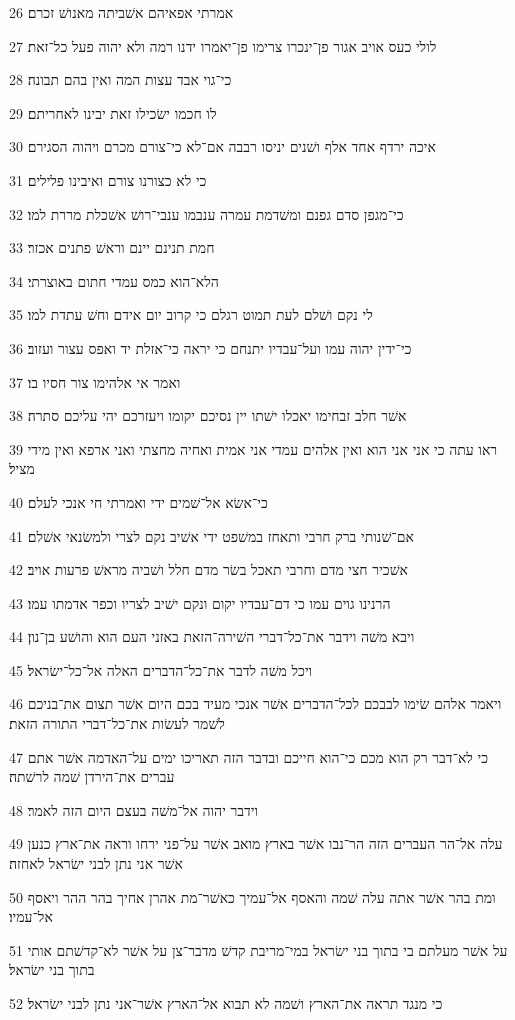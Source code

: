\par 26 אמרתי אפאיהם אשׁביתה מאנושׁ זכרם׃
\par 27 לולי כעס אויב אגור פן־ינכרו צרימו פן־יאמרו ידנו רמה ולא יהוה פעל כל־זאת׃
\par 28 כי־גוי אבד עצות המה ואין בהם תבונה׃
\par 29 לו חכמו ישׂכילו זאת יבינו לאחריתם׃
\par 30 איכה ירדף אחד אלף ושׁנים יניסו רבבה אם־לא כי־צורם מכרם ויהוה הסגירם׃
\par 31 כי לא כצורנו צורם ואיבינו פלילים׃
\par 32 כי־מגפן סדם גפנם ומשׁדמת עמרה ענבמו ענבי־רושׁ אשׁכלת מררת למו׃
\par 33 חמת תנינם יינם וראשׁ פתנים אכזר׃
\par 34 הלא־הוא כמס עמדי חתום באוצרתי׃
\par 35 לי נקם ושׁלם לעת תמוט רגלם כי קרוב יום אידם וחשׁ עתדת למו׃
\par 36 כי־ידין יהוה עמו ועל־עבדיו יתנחם כי יראה כי־אזלת יד ואפס עצור ועזוב׃
\par 37 ואמר אי אלהימו צור חסיו בו׃
\par 38 אשׁר חלב זבחימו יאכלו ישׁתו יין נסיכם יקומו ויעזרכם יהי עליכם סתרה׃
\par 39 ראו עתה כי אני אני הוא ואין אלהים עמדי אני אמית ואחיה מחצתי ואני ארפא ואין מידי מציל׃
\par 40 כי־אשׂא אל־שׁמים ידי ואמרתי חי אנכי לעלם׃
\par 41 אם־שׁנותי ברק חרבי ותאחז במשׁפט ידי אשׁיב נקם לצרי ולמשׂנאי אשׁלם׃
\par 42 אשׁכיר חצי מדם וחרבי תאכל בשׂר מדם חלל ושׁביה מראשׁ פרעות אויב׃
\par 43 הרנינו גוים עמו כי דם־עבדיו יקום ונקם ישׁיב לצריו וכפר אדמתו עמו׃
\par 44 ויבא משׁה וידבר את־כל־דברי השׁירה־הזאת באזני העם הוא והושׁע בן־נון׃
\par 45 ויכל משׁה לדבר את־כל־הדברים האלה אל־כל־ישׂראל׃
\par 46 ויאמר אלהם שׂימו לבבכם לכל־הדברים אשׁר אנכי מעיד בכם היום אשׁר תצום את־בניכם לשׁמר לעשׂות את־כל־דברי התורה הזאת׃
\par 47 כי לא־דבר רק הוא מכם כי־הוא חייכם ובדבר הזה תאריכו ימים על־האדמה אשׁר אתם עברים את־הירדן שׁמה לרשׁתה׃
\par 48 וידבר יהוה אל־משׁה בעצם היום הזה לאמר׃
\par 49 עלה אל־הר העברים הזה הר־נבו אשׁר בארץ מואב אשׁר על־פני ירחו וראה את־ארץ כנען אשׁר אני נתן לבני ישׂראל לאחזה׃
\par 50 ומת בהר אשׁר אתה עלה שׁמה והאסף אל־עמיך כאשׁר־מת אהרן אחיך בהר ההר ויאסף אל־עמיו׃
\par 51 על אשׁר מעלתם בי בתוך בני ישׂראל במי־מריבת קדשׁ מדבר־צן על אשׁר לא־קדשׁתם אותי בתוך בני ישׂראל׃
\par 52 כי מנגד תראה את־הארץ ושׁמה לא תבוא אל־הארץ אשׁר־אני נתן לבני ישׂראל׃

